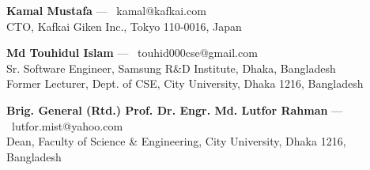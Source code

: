 
\begin{cvlistsection}


\item \textbf{Kamal Mustafa} — \faEnvelope\ \textcolor{Cerulean}{kamal@kafkai.com}\\
CTO, Kafkai Giken Inc., Tokyo 110‑0016, Japan

\item \textbf{Md Touhidul Islam} — \faEnvelope\ \textcolor{Cerulean}{touhid000cse@gmail.com}\\
Sr. Software Engineer, Samsung R\&D Institute, Dhaka, Bangladesh\\
Former Lecturer, Dept. of CSE, City University, Dhaka 1216, Bangladesh

\item \textbf{Brig. General (Rtd.) Prof. Dr. Engr. Md. Lutfor Rahman} — \faEnvelope\ \textcolor{Cerulean}{lutfor.mist@yahoo.com}\\ 
Dean, Faculty of Science \& Engineering, City University, Dhaka 1216, Bangladesh


\end{cvlistsection}
